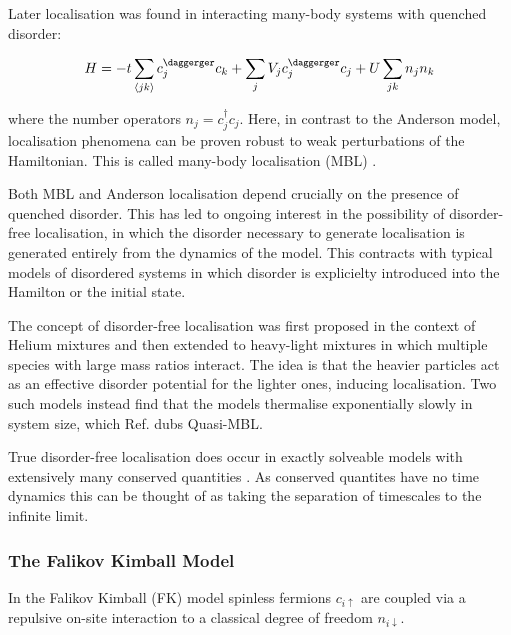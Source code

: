 Later localisation was found in interacting many-body systems with quenched disorder:

\[
H = -t\sum_{\langle jk \rangle} c^\daggerger_j c_k + \sum_j V_j c_j^\daggerger c_j + U\sum_{jk} n_j n_k
\]

where the number operators \(n_j = c^\dagger_j c_j\). Here, in contrast to the Anderson model, localisation phenomena can be proven robust to weak perturbations of the Hamiltonian. This is called many-body localisation (MBL) \textcite{imbrieManyBodyLocalizationQuantum2016}.

Both MBL and Anderson localisation depend crucially on the presence of quenched disorder. This has led to ongoing interest in the possibility of disorder-free localisation, in which the disorder necessary to generate localisation is generated entirely from the dynamics of the model. This contracts with typical models of disordered systems in which disorder is explicielty introduced into the Hamilton or the initial state.

The concept of disorder-free localisation was first proposed in the context of Helium mixtures \textcite{kagan1984localization} and then extended to heavy-light mixtures in which multiple species with large mass ratios interact. The idea is that the heavier particles act as an effective disorder potential for the lighter ones, inducing localisation. Two such models \autocite{yaoQuasiManyBodyLocalizationTranslationInvariant2016,schiulazDynamicsManybodyLocalized2015} instead find that the models thermalise exponentially slowly in system size, which Ref. \textcite{yaoQuasiManyBodyLocalizationTranslationInvariant2016} dubs Quasi-MBL.

True disorder-free localisation does occur in exactly solveable models with extensively many conserved quantities \textcite{smithDisorderFreeLocalization2017}. As conserved quantites have no time dynamics this can be thought of as taking the separation of timescales to the infinite limit.

\hypertarget{the-falikov-kimball-model}{%
\subsubsection{The Falikov Kimball Model}\label{the-falikov-kimball-model}}

In the Falikov Kimball (FK) model spinless fermions \(c_{i\uparrow}\) are coupled via a repulsive on-site interaction to a classical degree of freedom \(n_{i\downarrow}\).


